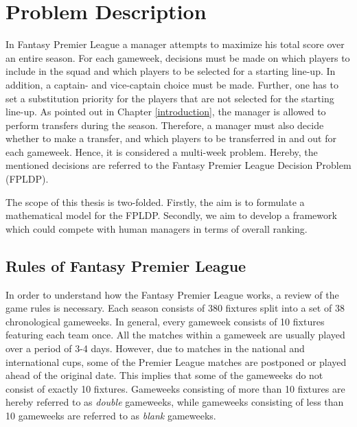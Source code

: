 
\chapter{Problem Description}
In Fantasy Premier League a manager attempts to maximize his total score over an entire season. For each gameweek, decisions must be made on which players to include in the squad and which players to be selected for a starting line-up. In addition, a captain- and vice-captain choice must be made. Further, one has to set a substitution priority for the players that are not selected for the starting line-up. As pointed out in Chapter \ref{introduction}, the manager is allowed to perform transfers during the season. Therefore, a manager must also decide whether to make a transfer, and which players to be transferred in and out for each gameweek. Hence, it is considered a multi-week problem. Hereby, the mentioned decisions are referred to the Fantasy Premier League Decision Problem (FPLDP).

\newpar

The scope of this thesis is two-folded. Firstly, the aim is to formulate a mathematical model for the FPLDP. Secondly, we aim to develop a framework which could compete with human managers in terms of overall ranking. 

\section{Rules of Fantasy Premier League} \label{rules of fpl}

In order to understand how the Fantasy Premier League works, a review of the game rules is necessary. Each season consists of 380 fixtures split into a set of 38 chronological gameweeks. In general, every gameweek consists of 10 fixtures featuring each team once. All the matches within a gameweek are usually played over a period of 3-4 days. However, due to matches in the national and international cups, some of the Premier League matches are postponed or played ahead of the original date. This implies that some of the gameweeks do not consist of exactly 10 fixtures. Gameweeks consisting of more than 10 fixtures are hereby referred to as \textit{double} gameweeks, while gameweeks consisting of less than 10 gameweeks are referred to as \textit{blank} gameweeks.


